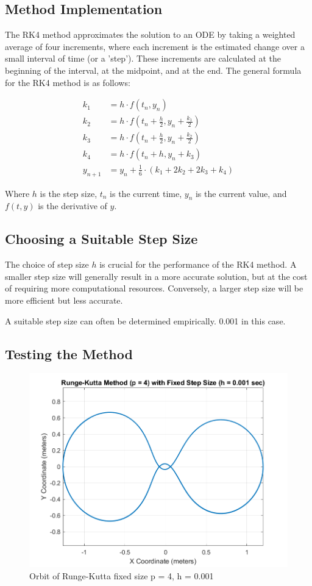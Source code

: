 \documentclass[12pt]{report}
\begin{document}
\subsection{Method Implementation}

The RK4 method approximates the solution to an ODE by taking a weighted average of four increments, where each increment is the estimated change over a small interval of time (or a 'step'). These increments are calculated at the beginning of the interval, at the midpoint, and at the end. The general formula for the RK4 method is as follows:

\begin{align*}
k_1 &= h \cdot f(t_n, y_n) \\
k_2 &= h \cdot f(t_n + \frac{h}{2}, y_n + \frac{k_1}{2}) \\
k_3 &= h \cdot f(t_n + \frac{h}{2}, y_n + \frac{k_2}{2}) \\
k_4 &= h \cdot f(t_n + h, y_n + k_3) \\
y_{n+1} &= y_n + \frac{1}{6} \cdot (k_1 + 2k_2 + 2k_3 + k_4)
\end{align*}

Where $h$ is the step size, $t_n$ is the current time, $y_n$ is the current value, and $f(t, y)$ is the derivative of $y$.

\subsection{Choosing a Suitable Step Size}

The choice of step size $h$ is crucial for the performance of the RK4 method. A smaller step size will generally result in a more accurate solution, but at the cost of requiring more computational resources. Conversely, a larger step size will be more efficient but less accurate.

A suitable step size can often be determined empirically. 0.001 in this case.

\subsection{Testing the Method}

\begin{figure}
    \centering
    \includegraphics[width = 0.8 \textwidth]{Figure_4.png}
    \caption{Orbit of Runge-Kutta fixed size p = 4, h = 0.001}
\end{figure}
\end{document}
